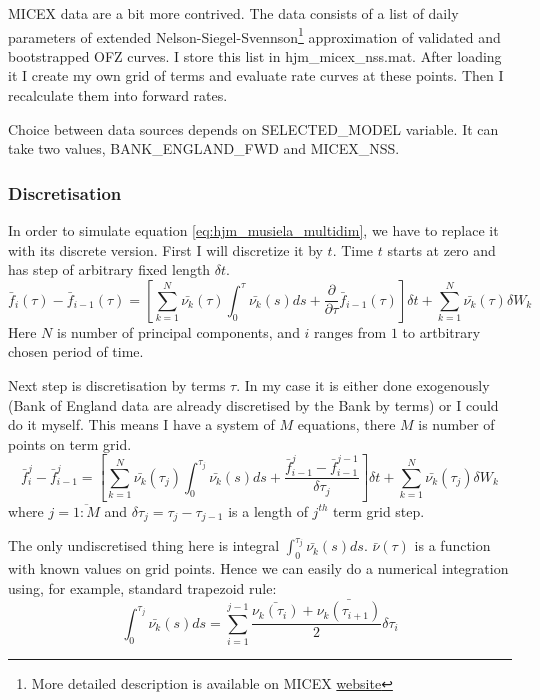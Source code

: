 \documentclass[11pt]{article} %
\begin{document}
MICEX data are a bit more contrived. The data consists of a list of daily parameters of extended Nelson-Siegel-Svennson\footnote{More detailed description is available on MICEX \href{http://rts.micex.ru/a80}{website}} approximation of validated and bootstrapped OFZ curves. I store this list in hjm\_micex\_nss.mat. After loading it I create my own grid of terms and evaluate rate curves at these points. Then I recalculate them into forward rates.

Choice between data sources depends on SELECTED\_MODEL variable. It can take two values, BANK\_ENGLAND\_FWD and MICEX\_NSS.

\subsubsection{Discretisation}
In order to simulate equation \eqref{eq:hjm_musiela_multidim}, we have to replace it with its discrete version. First I will discretize it by $t$. Time $t$ starts at zero and has step of arbitrary fixed length $\delta t$.
\begin{equation}
\bar{f}_i(\tau) - \bar{f}_{i-1}(\tau) = \left[\sum_{k=1}^N\bar{\nu_k}(\tau)\int_{0}^{\tau}\bar{\nu_k}(s)ds+ \frac{\partial}{\partial \tau}\bar{f}_{i-1}(\tau)\right]\delta t + \sum_{k=1}^N\bar{\nu_k}(\tau)\delta W_{k}
\end{equation}
Here $N$ is number of principal components, and $i$ ranges from $1$ to artbitrary chosen period of time.

Next step is discretisation by terms $\tau$. In my case it is either done exogenously (Bank of England data are already discretised by the Bank by terms) or I could do it myself. This means I have a system of $M$ equations, there $M$ is number of points on term grid.
\begin{equation} \label{eq:hjm_musiela_multidim_discrete}
\bar{f}_i^j - \bar{f}_{i-1}^j = \left[\sum_{k=1}^N\bar{\nu_k}(\tau_j)\int_{0}^{\tau_j}\bar{\nu_k}(s)ds+ \frac{\bar{f}_{i-1}^j-\bar{f}_{i-1}^{j-1}}{\delta\tau_j}\right]\delta t + \sum_{k=1}^N\bar{\nu_k}(\tau_j)\delta W_{k}
\end{equation}
where $j = \overline{1:M}$ and $\delta\tau_j = \tau_j - \tau_{j-1}$ is a length of $j^{th}$ term grid step. 

The only undiscretised thing here is integral $\int_{0}^{\tau_j}\bar{\nu_k}(s)ds$. $\bar{\nu}(\tau)$ is a function with known values on grid points. Hence we can easily do a numerical integration using, for example, standard trapezoid rule:
\begin{equation}
\int_{0}^{\tau_j}\bar{\nu_k}(s)ds = \sum_{i=1}^{j-1}\frac{\bar{\nu_k(\tau_i)}+\bar{\nu_k(\tau_{i+1})}}{2}\delta\tau_i
\end{equation}
\end{document}
